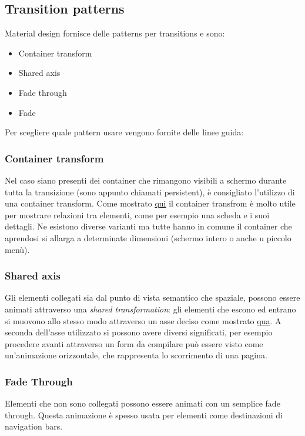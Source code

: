 \documentclass[12pt, a4paper]{report}
\begin{document}
		\subsection{Transition patterns} 
			Material design fornisce delle patterns per transitions e sono:
			\begin{itemize}
				\item Container transform
				\item Shared axis
    			\item Fade through
				\item Fade
			\end{itemize}
		Per scegliere quale pattern usare vengono fornite delle linee guida:
		\subsubsection{Container transform}
			Nel caso siano presenti dei container che rimangono visibili a schermo durante tutta la transizione (sono appunto chiamati persistent), è consigliato l'utilizzo di una container transform.
			Come mostrato \href{https://kstatic.googleusercontent.com/files/ba0be42ae71266d6e68503fe131ff522c906a23622af8dd6cddc06f55daaf9366e9431df3645d9328b9acf84674f526c59a67d91b5ea49ef63a7404b3b95fe47}{qui}
			il container transfrom è molto utile per mostrare relazioni tra elementi, come per esempio una scheda e i suoi dettagli.
			Ne esistono diverse varianti ma tutte hanno in comune il container che aprendosi si allarga a determinate dimensioni (schermo intero o anche u piccolo menù).
		\subsubsection{Shared axis}
			Gli elementi collegati sia dal punto di vista semantico che spaziale, possono essere animati attraverso una \textit{shared transformation}: gli elementi che escono ed entrano si muovono allo stesso modo attraverso un asse deciso come mostrato \href{https://kstatic.googleusercontent.com/files/d2e9627f4006e27d36d8e839d2f3f92f1de59558bebdbe725ce5b2e0bd8a0a8c32285e10aceb52431be2e61acf003fba809ddd8bbd464ee8256bad0eee98e9a1}{qua}.
			A seconda dell'asse utilizzato si possono avere diversi significati, per esempio procedere avanti attraverso un form da compilare può essere visto come un'animazione orizzontale, che rappresenta lo scorrimento di una pagina.
		\subsubsection{Fade Through}
			Elementi che non sono collegati possono essere animati con un semplice fade through. Questa animazione è spesso usata per elementi come destinazioni di navigation bars.
\end{document}
